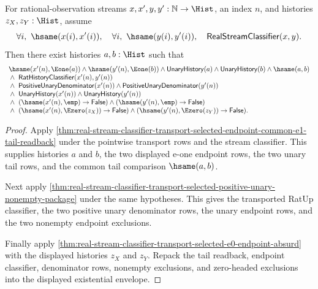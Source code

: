 \begin{theorem}
\label{thm:real-stream-classifier-transport-selected-common-e1-certified-shape-envelope}
For rational-observation streams $x,x',y,y':\mathbb{N}\to\Hist$, an index
$n$, and histories $z_X,z_Y:\Hist$, assume
$$
\forall i,\ \hsame(x(i),x'(i)),\quad
\forall i,\ \hsame(y(i),y'(i)),\quad
\mathsf{RealStreamClassifier}(x,y).
$$
Then there exist histories $a,b:\Hist$ such that
$$
\begin{array}{l}
\hsame(x'(n),\Eone(a))\land \hsame(y'(n),\Eone(b))\land
\mathsf{UnaryHistory}(a)\land \mathsf{UnaryHistory}(b)\land \hsame(a,b)\\
{}\land\ \mathsf{RatHistoryClassifier}(x'(n),y'(n))\\
{}\land\ \mathsf{PositiveUnaryDenominator}(x'(n))\land
\mathsf{PositiveUnaryDenominator}(y'(n))\\
{}\land\ \mathsf{UnaryHistory}(x'(n))\land
\mathsf{UnaryHistory}(y'(n))\\
{}\land\ (\hsame(x'(n),\emp)\to\mathsf{False})\land
(\hsame(y'(n),\emp)\to\mathsf{False})\\
{}\land\ (\hsame(x'(n),\Ezero(z_X))\to\mathsf{False})\land
(\hsame(y'(n),\Ezero(z_Y))\to\mathsf{False}).
\end{array}
$$
\end{theorem}
\begin{proof}
Apply
\autoref{thm:real-stream-classifier-transport-selected-endpoint-common-e1-tail-readback}
under the pointwise transport rows and the stream classifier. This supplies
histories $a$ and $b$, the two displayed e-one endpoint rows, the two unary tail
rows, and the common tail comparison $\hsame(a,b)$.

Next apply
\autoref{thm:real-stream-classifier-transport-selected-positive-unary-nonempty-package}
under the same hypotheses. This gives the transported RatUp classifier, the two
positive unary denominator rows, the unary endpoint rows, and the two nonempty
endpoint exclusions.

Finally apply
\autoref{thm:real-stream-classifier-transport-selected-e0-endpoint-absurd}
with the displayed histories $z_X$ and $z_Y$. Repack the tail readback, endpoint
classifier, denominator rows, nonempty exclusions, and zero-headed exclusions
into the displayed existential envelope.
\end{proof}

